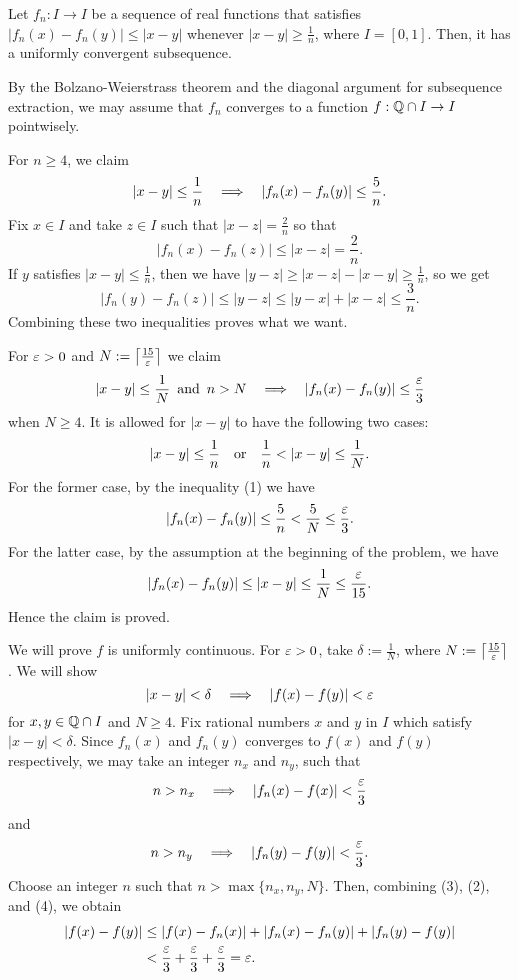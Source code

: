 \documentclass[11pt]{article}
\begin{document}
\begin{thm}
Let $f_n:I\to I$ be a sequence of real functions that satisfies $|f_n(x)-f_n(y)|\le|x-y|$ whenever $|x-y|\ge\frac1n$, where $I=[0,1]$.
Then, it has a uniformly convergent subsequence.
\end{thm}
\begin{pf}
By the Bolzano-Weierstrass theorem and the diagonal argument for subsequence extraction, we may assume that $f_n$ converges to a function $f:\Q\cap I\to I$ pointwisely.

\Step[1]
For $n\ge4$, we claim
\begin{align}|x-y|\le\frac1n\impl|f_n(x)-f_n(y)|\le\frac5n.\end{align}
Fix $x\in I$ and take $z\in I$ such that $|x-z|=\frac2n$ so that
\[|f_n(x)-f_n(z)|\le|x-z|=\frac2n.\]
If $y$ satisfies $|x-y|\le\frac1n$, then we have $|y-z|\ge|x-z|-|x-y|\ge\frac1n$, so we get
\[|f_n(y)-f_n(z)|\le|y-z|\le|y-x|+|x-z|\le\frac3n.\]
Combining these two inequalities proves what we want.

\Step[2]
For $\varepsilon>0$ and $N:=\left\lceil\frac{15}{\varepsilon}\right\rceil$ we claim
\begin{align}|x-y|\le\frac1N\p{and}n>N\impl|f_n(x)-f_n(y)|\le\frac\e3\end{align}
when $N\ge4$.
It is allowed for $|x-y|$ to have the following two cases:
\[|x-y|\le\frac1n\c{or}\frac1n<|x-y|\le\frac1N.\]
For the former case, by the inequality (1) we have
\[|f_n(x)-f_n(y)|\le\frac5n<\frac5N\le\frac{\varepsilon}3.\]
For the latter case, by the assumption at the beginning of the problem, we have
\[|f_n(x)-f_n(y)|\le|x-y|\le\frac1N\le\frac{\varepsilon}{15}.\]
Hence the claim is proved.

\Step[3]
We will prove $f$ is uniformly continuous.
For $\varepsilon>0$, take $\delta:=\frac1N$, where $N:=\left\lceil\frac{15}{\varepsilon}\right\rceil$.
We will show
\[|x-y|<\delta\impl|f(x)-f(y)|<\e\]
for $x,y\in\mathbb{Q}\cap I$ and $N\ge4$.
Fix rational numbers $x$ and $y$ in $I$ which satisfy $|x-y|<\delta$.
Since $f_n(x)$ and $f_n(y)$ converges to $f(x)$ and $f(y)$ respectively, we may take an integer $n_x$ and $n_y$, such that
\begin{align}n>n_x\impl |f_n(x)-f(x)|<\frac\e3\end{align}
and
\begin{align}n>n_y\impl |f_n(y)-f(y)|<\frac\e3.\end{align}
Choose an integer $n$ such that $n>\max\{n_x,n_y,N\}$.
Then, combining (3), (2), and (4), we obtain
\begin{align*}
|f(x)-f(y)|&\le|f(x)-f_n(x)|+|f_n(x)-f_n(y)|+|f_n(y)-f(y)|\\
&<\frac{\varepsilon}3+\frac{\varepsilon}3+\frac{\varepsilon}3=\varepsilon.
\end{align*}


\end{pf}
\end{document}
